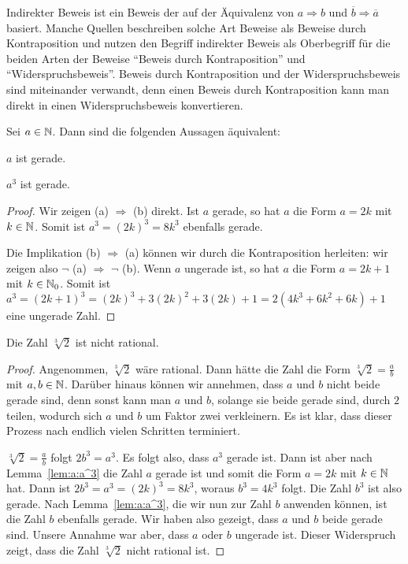 \begin{bem}
	Indirekter Beweis ist ein Beweis der auf der Äquivalenz von $a \Rightarrow b$ und $\overline{b} \Rightarrow \overline{a}$ basiert. Manche Quellen beschreiben solche Art Beweise als Beweise durch Kontraposition und nutzen den Begriff indirekter Beweis als Oberbegriff für die beiden Arten der Beweise ``Beweis durch Kontraposition'' und ``Widerspruchsbeweis''. Beweis durch Kontraposition und der Widerspruchsbeweis sind miteinander verwandt, denn einen Beweis durch Kontraposition kann man direkt in einen Widerspruchsbeweis konvertieren. 
\end{bem} 

\begin{lem} \label{lem:a:a^3}
	Sei $a \in \mathbb{N}$. Dann sind die folgenden Aussagen äquivalent: 
	\begin{enuma}
		\item $a$ ist gerade. 
		\item $a^3$ ist gerade. 
	\end{enuma} 
\end{lem} 
\begin{proof} 
	Wir zeigen (a) $\Rightarrow$ (b) direkt. Ist $a$ gerade, so hat $a$ die Form $a = 2 k$ mit $k \in \mathbb{N}$. Somit ist $a^3 = (2 k)^3 = 8 k^3$ ebenfalls gerade. 
	
	Die Implikation (b) $\Rightarrow$ (a) können wir durch die Kontraposition herleiten: wir zeigen also $\neg$ (a) $\Rightarrow$ $\neg$ (b). Wenn $a$ ungerade ist, so hat $a$ die Form $a = 2 k+1$ mit $k \in \mathbb{N}_0$. Somit ist $a^3  = (2k + 1)^3 = (2k)^3 + 3 (2k)^2 + 3 (2k) + 1 = 2 ( 4 k^3 + 6 k^2 + 6 k) + 1$ eine ungerade Zahl.  
\end{proof} 

\begin{thm}
	Die Zahl $\sqrt[3]{2}$ ist nicht rational. 
\end{thm} 
\begin{proof} 
	Angenommen, $\sqrt[3]{2}$ wäre rational. Dann hätte die Zahl die Form $\sqrt[3]{2} = \frac{a}{b}$ mit $a, b \in \mathbb{N}$. Darüber hinaus können wir annehmen, dass $a$ und $b$ nicht beide gerade sind, denn sonst kann man $a$ und $b$, solange sie beide gerade sind, durch $2$ teilen, wodurch sich $a$ und $b$ um Faktor zwei verkleinern. Es ist klar, dass dieser Prozess nach endlich vielen Schritten terminiert. 
	
	$\sqrt[3]{2} = \frac{a}{b}$ folgt $2 b^3  = a^3$. Es folgt also, dass $a^3$ gerade ist. Dann ist aber nach Lemma~\ref{lem:a:a^3} die Zahl $a$ gerade ist und somit die Form $a = 2 k$ mit $k \in \mathbb{N}$ hat. Dann ist $2 b^3 = a^3 = (2k)^3 = 8 k^3$, woraus $b^3= 4 k^3$ folgt. Die Zahl $b^3$ ist also gerade. Nach Lemma~\ref{lem:a:a^3}, die wir nun zur Zahl $b$ anwenden können, ist die Zahl $b$ ebenfalls gerade. Wir haben also gezeigt, dass $a$ und $b$ beide gerade sind. Unsere Annahme war aber, dass $a$ oder $b$ ungerade ist. Dieser Widerspruch zeigt, dass die Zahl $\sqrt[3]{2}$ nicht rational ist. 
\end{proof} 


